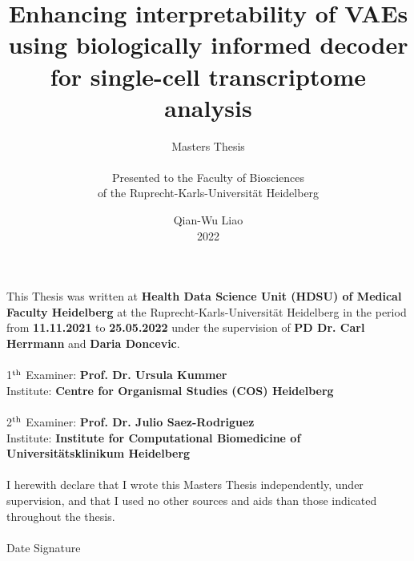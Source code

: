 \documentclass{report}
\title{\LARGE{Enhancing interpretability of VAEs using biologically informed decoder for single-cell transcriptome analysis}
\vspace{20mm}}
\author{
	\Large{Masters Thesis}\\
	\\
	\Large{Presented to the Faculty of Biosciences}\\
	\Large{of the Ruprecht-Karls-Universität Heidelberg}}
\date{
	\vspace{30mm}
	\Large{Qian-Wu Liao}\\
	\Large{2022}
}
\begin{document}
\maketitle

\thispagestyle{empty}
\noindent This Thesis was written at \textbf{Health Data Science Unit (HDSU) of Medical Faculty Heidelberg} at the Ruprecht-Karls-Universität Heidelberg in the period from \textbf{11.11.2021} to \textbf{25.05.2022} under the supervision of \textbf{PD Dr. Carl Herrmann} and \textbf{Daria Doncevic}.\vspace{5mm}\\
\\
1$\textsuperscript{th}$ Examiner: \textbf{Prof. Dr. Ursula Kummer}\\
Institute: \textbf{Centre for Organismal Studies (COS) Heidelberg}\\
\\
2$\textsuperscript{th}$ Examiner: \textbf{Prof. Dr. Julio Saez-Rodriguez}\\
Institute: \textbf{Institute for Computational Biomedicine of Universitätsklinikum Heidelberg}\vspace{2cm}\\
\\
\noindent I herewith declare that I wrote this Masters Thesis independently, under supervision, and that I used no other sources and aids than those indicated throughout the thesis.\vspace{1cm}\\
\\
Date \underline{\hspace{4cm}} \hspace{2cm} Signature \underline{\hspace{4cm}}
\end{document}
